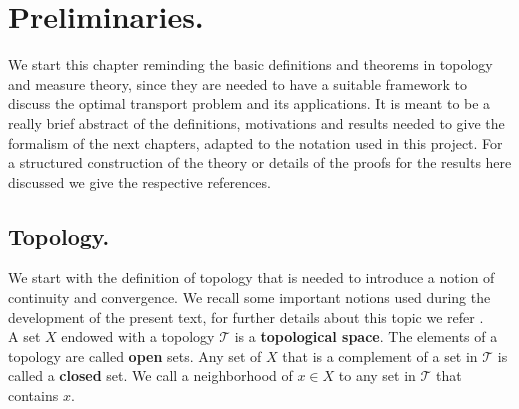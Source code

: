 \chapter{Preliminaries.}
We start this chapter reminding the basic definitions and theorems in topology and measure theory, since they are needed to have a suitable framework to discuss the optimal transport problem and its applications. It is meant to be a really brief abstract of the definitions, motivations and results needed to give the formalism of the next chapters, adapted to the notation used in this project. For a structured construction of the theory or details of the proofs for the results here discussed we give the respective references.


 

\section{Topology.}
We start with the definition of topology that is needed to introduce a notion of continuity and convergence. We recall some important notions used during the development of the present text, for further details about this topic we refer \cite{munkres2000topology}. 
\\

A set $X$ endowed with a topology $\mathcal{T}$ is a \textbf{topological space}. The elements of a topology are called \textbf{open} sets. Any set of $X$ that is a complement of a set in $\mathcal T$ is called a \textbf{closed} set. We call a neighborhood of $x\in X$ to any set in $\mathcal{T}$ that contains $x$.

